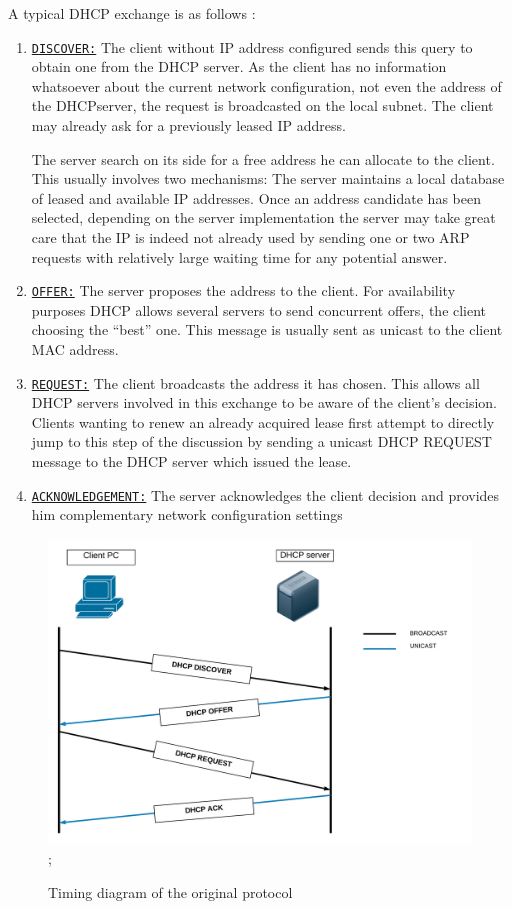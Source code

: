 \documentclass[12pt]{article}
\begin{document}
\begin{sloppypar}
\begin{sloppypar}
	
	A typical DHCP exchange is as follows :
	\begin{enumerate}
		
		\item \texttt{\underline{DISCOVER:}} The client without IP address configured sends this query to obtain one from the DHCP server. As the client has no information whatsoever about the current network configuration, not even the address of the DHCPserver, the request is broadcasted on the local subnet. The client may already ask for a previously leased IP address.
		
		The server search on its side for a free address he can allocate to the client. This usually involves two mechanisms:
		The server maintains a local database of leased and available IP addresses.
		Once an address candidate has been selected, depending on the server implementation the server may take great care that the IP is indeed not already used by sending one or two ARP requests with relatively large waiting time for any potential answer.
		
		\item \texttt{\underline{OFFER:}} The server proposes the address to the client. For availability purposes DHCP allows several servers to send concurrent offers, the client choosing the “best” one. This message is usually sent as unicast to the client MAC address.
		
		\item \texttt{\underline{REQUEST:}} The client broadcasts the address it has chosen. This allows all DHCP servers involved in this exchange to be aware of the client’s decision.
		Clients wanting to renew an already acquired lease first attempt to directly jump to this step of the discussion by sending a unicast DHCP REQUEST message to the DHCP server which issued the lease.
		
		\item \texttt{\underline{ACKNOWLEDGEMENT:}} The server acknowledges the client decision and provides him complementary network configuration settings 
	\end{enumerate}
	
	
	\begin{figure}[h]
		\centering
		\includegraphics[width=12 cm,height=9 cm]{images/DHCP.png};
		\caption{Timing diagram of the original protocol}
	\end{figure}
	

\end{sloppypar}
\end{sloppypar}
\end{document}
